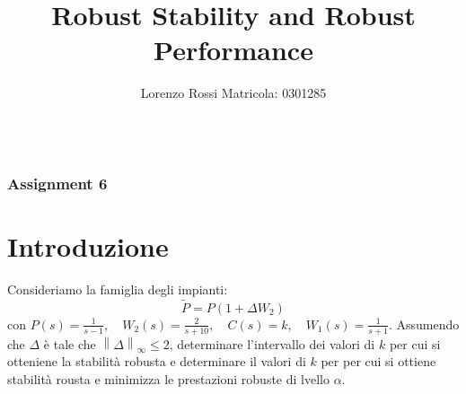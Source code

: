 \documentclass{beamer}
\title[Assignments 6]{Robust Stability and Robust Performance}
\author{Lorenzo Rossi Matricola: 0301285}
\begin{document}
\begin{frame}
	\titlepage{}
\end{frame}
\begin{frame}
	\begin{columns}[t]
		\begin{column}{.5\textwidth}
			\tableofcontents[sections={1-3}] %
		\end{column}
		\hspace{-1cm}
		\begin{column}{.5\textwidth}
			\tableofcontents[sections={4-5}] %
		\end{column}
	\end{columns}
\end{frame}
\begin{frame}
	\frametitle{Assignment 6}
	\section{Introduzione}
	Consideriamo la famiglia degli impianti:\begin{equation}
		\tilde{P}= P(1+\Delta W_{2})
	\end{equation}
	con \(P(s)=\frac{1}{s-1},\quad W_{2}(s)=\frac{2}{s+10},\quad C(s)=k,\quad W_{1}(s)=\frac{1}{s+1}\). Assumendo che \(\Delta \) è tale che \(\left\lVert \Delta\right\rVert_{\infty }\leq 2\), determinare l'intervallo dei valori di \(k\) per cui si otteniene la stabilità robusta e determinare il valori di \(k\) per per cui si ottiene stabilità rousta e minimizza le prestazioni robuste di lvello \(\alpha \).
\end{frame}
\end{document}
